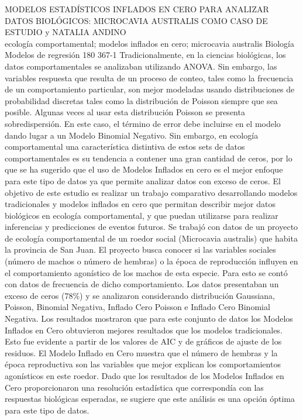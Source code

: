 \A
{MODELOS ESTADÍSTICOS INFLADOS EN CERO PARA ANALIZAR DATOS BIOLÓGICOS: MICROCAVIA AUSTRALIS COMO CASO DE ESTUDIO}
{ y NATALIA ANDINO}
{
\\}
{ecología comportamental; modelos inflados en cero; microcavia australis} 
 {Biología} 
 {Modelos de regresión} 
 {180} 
 {367-1}
{Tradicionalmente, en la ciencias biológicas, los datos comportamentales se analizaban utilizando ANOVA. Sin embargo, las variables respuesta que resulta de un proceso de conteo, tales como la frecuencia de un comportamiento particular, son mejor modeladas usando distribuciones de probabilidad discretas tales como la distribución de Poisson siempre que sea posible. Algunas veces al usar esta distribución Poisson se presenta sobredispersión. En este caso, el término de error debe incluirse en el modelo dando lugar a un Modelo Binomial Negativo. Sin embargo, en ecología comportamental una característica distintiva de estos sets de datos comportamentales es su tendencia a contener una gran cantidad de ceros, por lo que se ha sugerido que el uso de Modelos Inflados en cero es el mejor enfoque para este tipo de datos ya que permite analizar datos con exceso de ceros. El objetivo de este estudio es realizar un trabajo comparativo desarrollando modelos tradicionales y modelos inflados en cero que permitan describir mejor datos biológicos en ecología comportamental, y que puedan utilizarse para realizar inferencias y predicciones de eventos futuros. Se trabajó con datos de un proyecto de ecología comportamental de un roedor social (Microcavia australis) que habita la provincia de San Juan. El proyecto busca conocer si las variables sociales (número de machos o número de hembras) o la época de reproducción influyen en el comportamiento agonístico de los machos de esta especie. Para esto se contó con datos de frecuencia de dicho comportamiento. Los datos presentaban un exceso de ceros (78\%) y se analizaron considerando distribución Gaussiana, Poisson, Binomial Negativa, Inflado Cero Poisson e Inflado Cero Binomial Negativa. Los resultados mostraron que para este conjunto de datos los Modelos Inflados en Cero obtuvieron mejores resultados que los modelos tradicionales. Esto fue evidente a partir de los valores de AIC y de gráficos de ajuste de los residuos. El Modelo Inflado en Cero muestra que el número de hembras y la época reproductiva son las variables que mejor explican los comportamientos agonísticos en este roedor. Dado que los resultados de los Modelos Inflados en Cero proporcionaron una resolución estadística que correspondía con las respuestas biológicas esperadas, se sugiere que este análisis es una opción óptima para este tipo de datos.}
